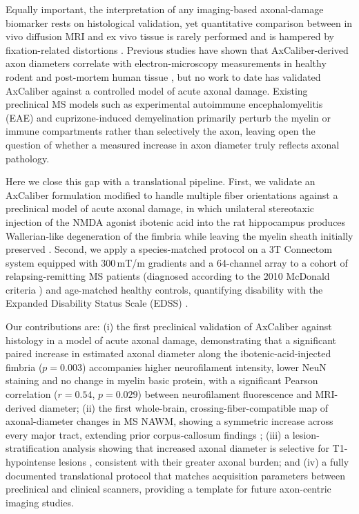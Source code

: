 Equally important, the interpretation of any imaging-based axonal-damage biomarker rests on histological validation, yet quantitative comparison between in vivo diffusion MRI and ex vivo tissue is rarely performed and is hampered by fixation-related distortions \cite{horowitz2015axon}. Previous studies have shown that AxCaliber-derived axon diameters correlate with electron-microscopy measurements in healthy rodent and post-mortem human tissue \cite{barazany2009invivo,horowitz2015axon}, but no work to date has validated AxCaliber against a controlled model of acute axonal damage. Existing preclinical MS models such as experimental autoimmune encephalomyelitis (EAE) and cuprizone-induced demyelination \cite{constantinescu2011eae,torkildsen2008cuprizone} primarily perturb the myelin or immune compartments rather than selectively the axon, leaving open the question of whether a measured increase in axon diameter truly reflects axonal pathology.

Here we close this gap with a translational pipeline. First, we validate an AxCaliber formulation modified to handle multiple fiber orientations \cite{desantis2019whole,tax2014recursive} against a preclinical model of acute axonal damage, in which unilateral stereotaxic injection of the NMDA agonist ibotenic acid into the rat hippocampus produces Wallerian-like degeneration of the fimbria while leaving the myelin sheath initially preserved \cite{conforti2014wallerian,adalbert2012intra}. Second, we apply a species-matched protocol on a 3T Connectom system equipped with 300\,mT/m gradients and a 64-channel array \cite{jones2018microstructural} to a cohort of relapsing-remitting MS patients (diagnosed according to the 2010 McDonald criteria \cite{polman2011diagnostic}) and age-matched healthy controls, quantifying disability with the Expanded Disability Status Scale (EDSS) \cite{kurtzke1983rating}.

Our contributions are: (i) the first preclinical validation of AxCaliber against histology in a model of acute axonal damage, demonstrating that a significant paired increase in estimated axonal diameter along the ibotenic-acid-injected fimbria ($p=0.003$) accompanies higher neurofilament intensity, lower NeuN staining and no change in myelin basic protein, with a significant Pearson correlation ($r=0.54$, $p=0.029$) between neurofilament fluorescence and MRI-derived diameter; (ii) the first whole-brain, crossing-fiber-compatible map of axonal-diameter changes in MS NAWM, showing a symmetric increase across every major tract, extending prior corpus-callosum findings \cite{desantis2019whole,ercan2015multimodal}; (iii) a lesion-stratification analysis showing that increased axonal diameter is selective for T1-hypointense lesions \cite{vanwaesberghe1999axonal}, consistent with their greater axonal burden; and (iv) a fully documented translational protocol that matches acquisition parameters between preclinical and clinical scanners, providing a template for future axon-centric imaging studies.

